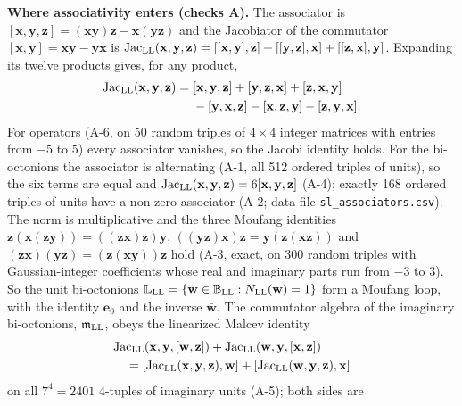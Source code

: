 \documentclass[
  10pt,
]{article}
\begin{document}
\textbf{Where associativity enters (checks A).} The associator is
\([\mathbf x,\mathbf y,\mathbf z]=(\mathbf x\mathbf y)\mathbf z-\mathbf x(\mathbf y\mathbf z)\)
and the Jacobiator of the commutator
\([\mathbf x,\mathbf y]=\mathbf x\mathbf y-\mathbf y\mathbf x\) is
\(\mathrm{Jac}_{\rm LL}(\mathbf x,\mathbf y,\mathbf z)=[[\mathbf x,\mathbf y],\mathbf z]+[[\mathbf y,\mathbf z],\mathbf x]+[[\mathbf z,\mathbf x],\mathbf y]\).
Expanding its twelve products gives, for any product,
\[\begin{aligned}\mathrm{Jac}_{\rm LL}(\mathbf x,\mathbf y,\mathbf z)={}&[\mathbf x,\mathbf y,\mathbf z]+[\mathbf y,\mathbf z,\mathbf x]+[\mathbf z,\mathbf x,\mathbf y]\\&-[\mathbf y,\mathbf x,\mathbf z]-[\mathbf x,\mathbf z,\mathbf y]-[\mathbf z,\mathbf y,\mathbf x].\end{aligned}\]
For operators (A-6, on 50 random triples of \(4\times4\) integer
matrices with entries from \(-5\) to \(5\)) every associator vanishes,
so the Jacobi identity holds. For the bi-octonions the associator is
alternating (A-1, all 512 ordered triples of units), so the six terms
are equal and
\(\mathrm{Jac}_{\rm LL}(\mathbf x,\mathbf y,\mathbf z)=6[\mathbf x,\mathbf y,\mathbf z]\)
(A-4); exactly 168 ordered triples of units have a non-zero associator
(A-2; data file \texttt{sl\_associators.csv}). The norm is
multiplicative and the three Moufang identities
\(\mathbf z(\mathbf x(\mathbf z\mathbf y))=((\mathbf z\mathbf x)\mathbf z)\mathbf y\),
\(((\mathbf y\mathbf z)\mathbf x)\mathbf z=\mathbf y(\mathbf z(\mathbf x\mathbf z))\)
and
\((\mathbf z\mathbf x)(\mathbf y\mathbf z)=(\mathbf z(\mathbf x\mathbf y))\mathbf z\)
hold (A-3, exact, on 300 random triples with Gaussian-integer
coefficients whose real and imaginary parts run from \(-3\) to \(3\)).
So the unit bi-octonions
\(\mathbb L_{\rm LL}=\{\mathbf w\in\mathbb B_{\rm LL}:N_{\rm LL}(\mathbf w)=1\}\)
form a Moufang loop, with the identity \(\mathbf e_0\) and the inverse
\(\bar{\mathbf w}\). The commutator algebra of the imaginary
bi-octonions, \(\mathfrak m_{\rm LL}\), obeys the linearized Malcev
identity
\[\begin{aligned}&\mathrm{Jac}_{\rm LL}(\mathbf x,\mathbf y,[\mathbf w,\mathbf z])+\mathrm{Jac}_{\rm LL}(\mathbf w,\mathbf y,[\mathbf x,\mathbf z])\\&\quad=[\mathrm{Jac}_{\rm LL}(\mathbf x,\mathbf y,\mathbf z),\mathbf w]+[\mathrm{Jac}_{\rm LL}(\mathbf w,\mathbf y,\mathbf z),\mathbf x]\end{aligned}\]
on all \(7^4=2401\) 4-tuples of imaginary units (A-5); both sides are
\end{document}
